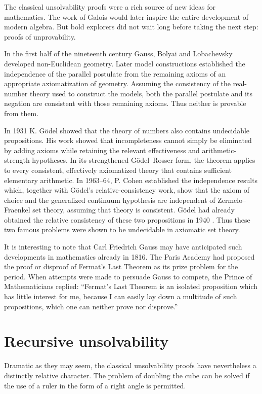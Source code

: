 \documentclass[11pt]{article}
\newcommand{\origpage}[1]{\marginnote{\footnotesize\textbf{[#1]}}}
\begin{document}
The classical unsolvability proofs were a rich source of new ideas for mathematics. The work of Galois would later inspire the entire development of modern algebra. But bold explorers did not wait long before taking the next step: proofs of unprovability.

In the first half of the nineteenth century Gauss, Bolyai and Lobachevsky developed non-Euclidean geometry. Later model constructions established the independence of the parallel postulate from the remaining axioms of an appropriate axiomatization of geometry. Assuming the consistency of the real-number theory used to construct the models, both the parallel postulate and its negation are consistent with those remaining axioms. Thus neither is provable from them.

In 1931 K. Gödel showed \cite{r13} that the theory of numbers also contains undecidable propositions. His work showed that incompleteness cannot simply be eliminated by adding axioms while retaining the relevant effectiveness and arithmetic-strength hypotheses. In its strengthened Gödel--Rosser form, the theorem applies to every consistent, effectively axiomatized theory that contains sufficient elementary arithmetic. In 1963--64, P. Cohen \cite{r7} established the independence results which, together with Gödel's relative-consistency work, show that the axiom of choice and the generalized continuum hypothesis are independent of Zermelo--Fraenkel set theory, assuming that theory is consistent. Gödel had already obtained the relative consistency of these two propositions in 1940 \cite{r12}. Thus these two famous problems were shown to be undecidable in axiomatic set theory.

It is interesting to note that Carl Friedrich Gauss may have anticipated such developments in mathematics already in 1816. The Paris Academy had proposed the proof or disproof of Fermat's Last Theorem as its prize problem for the period. When attempts were made to persuade Gauss to compete, the Prince of Mathematicians replied: ``Fermat's Last Theorem is an isolated proposition which has little interest for me, because I can easily lay down a multitude of such propositions, which one can neither prove nor disprove.''


\section{Recursive unsolvability} \origpage{725}Dramatic as they may seem, the classical unsolvability proofs have nevertheless a distinctly relative character. The problem of doubling the cube can be solved if the use of a ruler in the form of a right angle is permitted.
\end{document}

